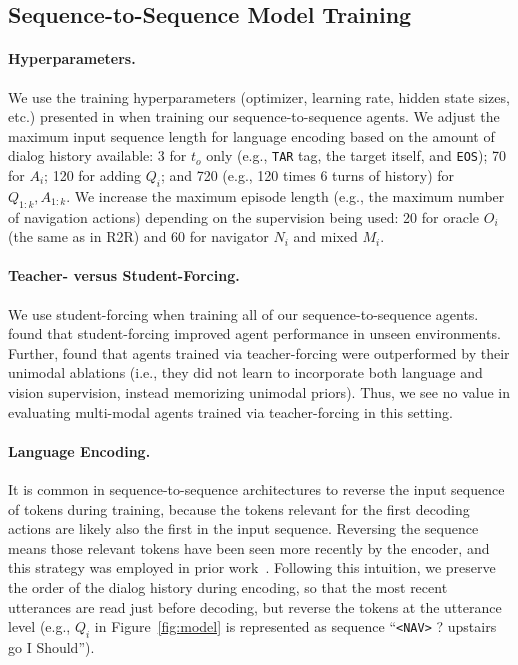 \documentclass{article}
\begin{document}
\subsection{Sequence-to-Sequence Model Training}

\paragraph{Hyperparameters.}
We use the training hyperparameters (optimizer, learning rate, hidden state sizes, etc.) presented in \citet{anderson:cvpr18} when training our sequence-to-sequence agents.
We adjust the maximum input sequence length for language encoding based on the amount of dialog history available: 3 for $t_o$ only (e.g., \texttt{TAR} tag, the target itself, and \texttt{EOS}); 70 for $A_i$; 120 for adding $Q_i$; and 720 (e.g., 120 times 6 turns of history) for $Q_{1:k},A_{1:k}$.
We increase the maximum episode length (e.g., the maximum number of navigation actions) depending on the supervision being used: 20 for oracle $O_i$ (the same as in R2R) and 60 for navigator $N_i$ and mixed $M_i$.

\paragraph{Teacher- versus Student-Forcing.}
We use student-forcing when training all of our sequence-to-sequence agents.
\citet{anderson:cvpr18} found that student-forcing improved agent performance in unseen environments.
Further, \citet{thomason:naacl19} found that agents trained via teacher-forcing were outperformed by their unimodal ablations (i.e., they did not learn to incorporate both language and vision supervision, instead memorizing unimodal priors).
Thus, we see no value in evaluating multi-modal agents trained via teacher-forcing in this setting.

\paragraph{Language Encoding.}
It is common in sequence-to-sequence architectures to reverse the input sequence of tokens during training, because the tokens relevant for the first decoding actions are likely also the first in the input sequence.
Reversing the sequence means those relevant tokens have been seen more recently by the encoder, and this strategy was employed in prior work~\cite{anderson:cvpr18}.
Following this intuition, we preserve the order of the dialog history during encoding, so that the most recent utterances are read just before decoding, but reverse the tokens at the utterance level (e.g., $Q_i$ in Figure~\ref{fig:model} is represented as sequence ``\texttt{<NAV>} ? upstairs go I Should'').
\end{document}
